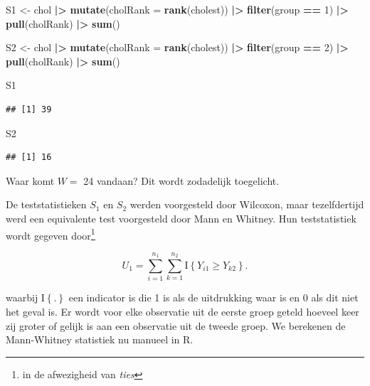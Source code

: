 \documentclass[
  12pt,dutch]{book}
\newenvironment{Shaded}{\begin{snugshade}}{\end{snugshade}}
\newcommand{\AttributeTok}[1]{\textcolor[rgb]{0.13,0.29,0.53}{#1}}
\newcommand{\DecValTok}[1]{\textcolor[rgb]{0.00,0.00,0.81}{#1}}
\newcommand{\FunctionTok}[1]{\textcolor[rgb]{0.13,0.29,0.53}{\textbf{#1}}}
\newcommand{\NormalTok}[1]{#1}
\newcommand{\OtherTok}[1]{\textcolor[rgb]{0.56,0.35,0.01}{#1}}
\newcommand{\SpecialCharTok}[1]{\textcolor[rgb]{0.81,0.36,0.00}{\textbf{#1}}}
\theoremstyle{definition}
\theoremstyle{definition}
\theoremstyle{definition}
\theoremstyle{definition}
\theoremstyle{remark}
\begin{document}
\begin{Shaded}
\begin{Highlighting}[]
\NormalTok{S1 }\OtherTok{\textless{}{-}}\NormalTok{ chol }\SpecialCharTok{|\textgreater{}}
    \FunctionTok{mutate}\NormalTok{(}\AttributeTok{cholRank =} \FunctionTok{rank}\NormalTok{(cholest)) }\SpecialCharTok{|\textgreater{}}
    \FunctionTok{filter}\NormalTok{(group }\SpecialCharTok{==} \DecValTok{1}\NormalTok{) }\SpecialCharTok{|\textgreater{}}
    \FunctionTok{pull}\NormalTok{(cholRank) }\SpecialCharTok{|\textgreater{}}
    \FunctionTok{sum}\NormalTok{()}

\NormalTok{S2 }\OtherTok{\textless{}{-}}\NormalTok{ chol }\SpecialCharTok{|\textgreater{}}
    \FunctionTok{mutate}\NormalTok{(}\AttributeTok{cholRank =} \FunctionTok{rank}\NormalTok{(cholest)) }\SpecialCharTok{|\textgreater{}}
    \FunctionTok{filter}\NormalTok{(group }\SpecialCharTok{==} \DecValTok{2}\NormalTok{) }\SpecialCharTok{|\textgreater{}}
    \FunctionTok{pull}\NormalTok{(cholRank) }\SpecialCharTok{|\textgreater{}}
    \FunctionTok{sum}\NormalTok{()}

\NormalTok{S1}
\end{Highlighting}
\end{Shaded}

\begin{verbatim}
## [1] 39
\end{verbatim}

\begin{Shaded}
\begin{Highlighting}[]
\NormalTok{S2}
\end{Highlighting}
\end{Shaded}

\begin{verbatim}
## [1] 16
\end{verbatim}

Waar komt \(W=\) 24 vandaan? Dit wordt zodadelijk toegelicht.

De teststatistieken \(S_1\) en \(S_2\) werden voorgesteld door Wilcoxon, maar tezelfdertijd werd een equivalente test voorgesteld door Mann en Whitney. Hun teststatistiek wordt gegeven door\footnote{in de afwezigheid van \emph{ties}}

\[
 U_1 = \sum_{i=1}^{n_1}\sum_{k=1}^{n_2} \text{I}\left\{Y_{i1}\geq Y_{k2}\right\}.
\]

waarbij \(\text{I}\left\{.\right\}\) een indicator is die 1 is als de uitdrukking waar is en 0 als dit niet het geval is.
Er wordt voor elke observatie uit de eerste groep geteld hoeveel keer zij groter of gelijk is aan een observatie uit de tweede groep.
We berekenen de Mann-Whitney statistiek nu manueel in R.
\end{document}
